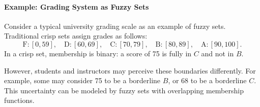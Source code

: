 \paragraph{Example: Grading System as Fuzzy Sets}

Consider a typical university grading scale as an example of fuzzy sets. Traditional crisp sets assign grades as follows:
\[
\text{F}: [0, 59], \quad \text{D}: [60, 69], \quad \text{C}: [70, 79], \quad \text{B}: [80, 89], \quad \text{A}: [90, 100].
\]
In a crisp set, membership is binary: a score of 75 is fully in \(C\) and not in \(B\).

However, students and instructors may perceive these boundaries differently. For example, some may consider 75 to be a borderline \(B\), or 68 to be a borderline \(C\). This uncertainty can be modeled by fuzzy sets with overlapping membership functions.

